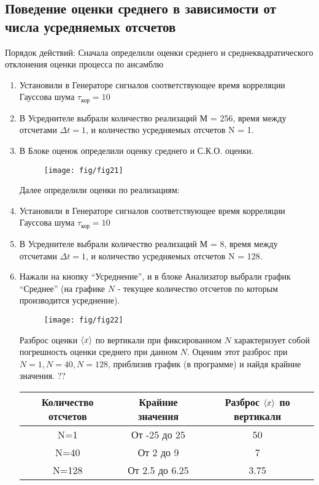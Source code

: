 \documentclass[a4paper,14pt]{extarticle}
\begin{document}
\subsection[Задание 2]{Поведение оценки среднего в зависимости от числа усредняемых отсчетов}
Порядок действий:
Сначала определили оценки среднего и среднеквадратического отклонения оценки процесса по ансамблю
\begin{enumerate}
	\item Установили в Генераторе сигналов соответствующее время корреляции Гауссова шума $\tau_\text{кор} = 10$
	\item В Усреднителе выбрали количество реализаций М = 256, время между отсчетами $\Delta t = 1$, и количество усредняемых отсчетов N = 1.
	\item 	В Блоке оценок определили оценку среднего и С.К.О. оценки.	
	\begin{figure}[H]
		\centering
        \texttt{[image: fig/fig21]}
	\end{figure}

	Далее определили оценки по реализациям:
	\item Установили в Генераторе сигналов соответствующее время корреляции Гауссова шума $\tau_\text{кор} = 10$
	\item В Усреднителе выбрали количество реализаций М = 8, время между отсчетами $\Delta t = 1$, и количество усредняемых отсчетов N = 128.
	\item Нажали на кнопку “Усреднение”, и в блоке Анализатор выбрали график “Среднее” (на графике $N$ - текущее количество отсчетов по которым производится усреднение).
	\begin{figure}[H]
		\centering
        \texttt{[image: fig/fig22]}
	\end{figure}

Разброс оценки $\langle x\rangle$ по вертикали при фиксированном $N$ характеризует собой погрешность оценки среднего при данном $N$. 
Оценим этот разброс при $N=1, N=40, N=128$, приблизив график (в программе) и найдя крайние значения. ??

\begin{table}[h!]
	\centering
	\begin{tabular}{|c|c|c|}
		\hline
		\textbf{Количество отсчетов} & \textbf{Крайние значения} &{\textbf{Разброс $\langle x\rangle$ по вертикали}} \\
		\hline
		N=1   & От -25 до 25 & 50 \\
		\hline
		N=40  & От 2 до 9 & 7 \\
		\hline
		N=128 & От 2.5 до 6.25 & 3.75 \\
		\hline
	\end{tabular}%
\end{table}%
\end{enumerate}
\end{document}
